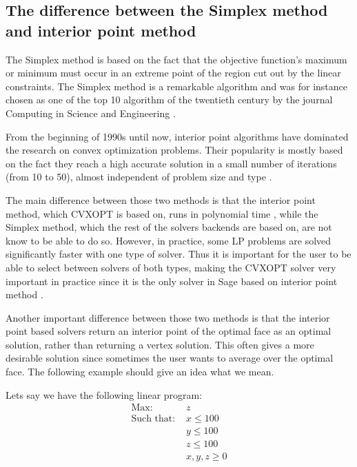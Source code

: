 \subsection{The difference between the Simplex method and interior point method}
The Simplex method is based on the fact that the objective function's maximum or minimum must occur in an extreme point of the region cut out by the linear constraints. 
The Simplex method is a remarkable algorithm and was for instance chosen as one of the top 10 algorithm of the twentieth century by the journal Computing in Science and Engineering \cite{top10}.


From the beginning of 1990s until now, interior point algorithms have dominated the research on convex optimization problems. Their popularity is mostly based on the fact they reach a high accurate solution in a small number of iterations (from 10 to 50), almost independent of problem size and type \cite{interior}.


The main difference between those two methods is that the interior point method, which CVXOPT is based on, runs in polynomial time \cite{simplexpoly}, while the Simplex method, which the rest of the solvers backends are based on, are not know to be able to do so. However, in practice, some LP problems are solved significantly faster with one type of solver. Thus it is important for the user to be able to select between solvers of both types, making the CVXOPT solver very important in practice since it is the only solver in Sage based on interior point method \cite{wikilinear}.

Another important difference between those two methods is that the interior point based solvers return an interior point of the optimal face as an optimal solution, rather than returning a vertex solution. This often gives a more desirable solution since sometimes the user wants to average over the optimal face. The following  example should give an idea what we mean. 





















Lets say we have the following linear program:
\begin{align}
\text{Max: } & z\\
\text{Such that: } & x \leq 100\\
\text{} & y \leq 100\\
\text{} & z \leq 100\\
\text{} & x,y,z \geq 0
\end{align}


